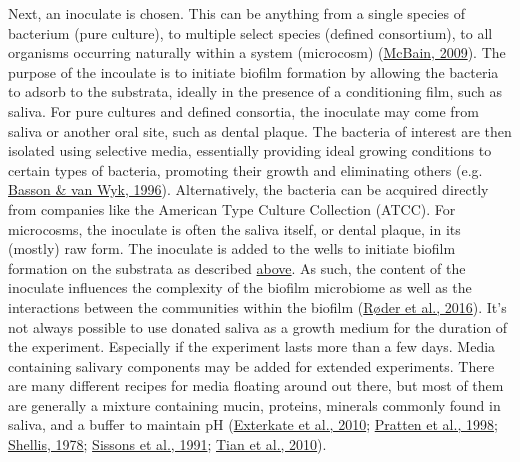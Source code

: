 \documentclass[
  letterpaper,
]{book}
\begin{document}
Next, an inoculate is chosen. This can be anything from a single species
of bacterium (pure culture), to multiple select species (defined
consortium), to all organisms occurring naturally within a system
(microcosm) (\protect\hyperlink{ref-mcbainBiofilmModels2009}{McBain,
2009}). The purpose of the incoulate is to initiate biofilm formation by
allowing the bacteria to adsorb to the substrata, ideally in the
presence of a conditioning film, such as saliva. For pure cultures and
defined consortia, the inoculate may come from saliva or another oral
site, such as dental plaque. The bacteria of interest are then isolated
using selective media, essentially providing ideal growing conditions to
certain types of bacteria, promoting their growth and eliminating others
(e.g. \protect\hyperlink{ref-bassonEstablishmentCommunity1996}{Basson \&
van Wyk, 1996}). Alternatively, the bacteria can be acquired directly
from companies like the American Type Culture Collection (ATCC). For
microcosms, the inoculate is often the saliva itself, or dental plaque,
in its (mostly) raw form. The inoculate is added to the wells to
initiate biofilm formation on the substrata as described
\protect\hyperlink{dental-plaque}{above}. As such, the content of the
inoculate influences the complexity of the biofilm microbiome as well as
the interactions between the communities within the biofilm
(\protect\hyperlink{ref-roderStudyingBacterial2016}{Røder et al.,
2016}). It's not always possible to use donated saliva as a growth
medium for the duration of the experiment. Especially if the experiment
lasts more than a few days. Media containing salivary components may be
added for extended experiments. There are many different recipes for
media floating around out there, but most of them are generally a
mixture containing mucin, proteins, minerals commonly found in saliva,
and a buffer to maintain pH
(\protect\hyperlink{ref-extercateAAA2010}{Exterkate et al., 2010};
\protect\hyperlink{ref-prattenVitroStudies1998}{Pratten et al., 1998};
\protect\hyperlink{ref-shellisSyntheticSaliva1978}{Shellis, 1978};
\protect\hyperlink{ref-sissonsMultistationPlaque1991}{Sissons et al.,
1991}; \protect\hyperlink{ref-tianUsingDGGE2010}{Tian et al., 2010}).
\end{document}
